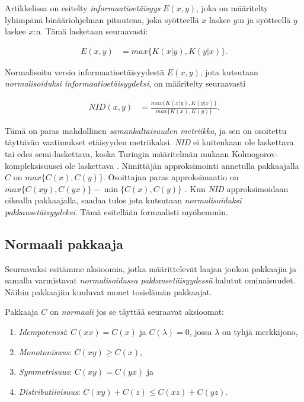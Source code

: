 \documentclass[12pt,finnish]{tktltiki2}
\theoremstyle{definition}
\theoremstyle{remark}
\newcommand{\kolmogorov}{Kolmogorov-kompleksisuus}
\begin{document}
  Artikkelissa \cite{CV05} on esitelty \emph{informaatioetäisyys} $E(x,y)$, joka on määritelty lyhimpänä binääriohjelman pituutena, joka syötteellä $x$ laskee $y$:n ja syötteellä $y$ laskee $x$:n. Tämä lasketaan seuraavasti:

  \begin{align}
    E(x,y) &= max\{K(x|y),K(y|x)\}.
  \end{align}

  Normalisoitu versio informaatioetäisyydestä $E(x,y)$, jota kutsutaan \emph{normalisoiduksi informaatioetäisyydeksi}, on määritelty seuraavasti

  \begin{align}
    NID(x,y) &= \frac{ max\{K{(x|y)},K{(y|x)}\} }{ max \{K(x),K(y)\}}.
  \end{align}

  Tämä on paras mahdollinen \emph{samankaltaisuuden metriikka}, ja sen on osoitettu \cite{CV05} täyttävän vaatimukset etäisyyden metriikaksi.
  \emph{NID} ei kuitenkaan ole laskettava tai edes semi-laskettava, koska Turingin määritelmän mukaan \kolmogorov ei ole laskettava \cite{CV05}.
  Nimittäjän approksimointi annetulla pakkaajalla $C$ on $max \{C(x),C(y)\}$.
  Osoittajan paras approksimaatio on $max\{C(xy),C(yx)\} - \min\{C(x),C(y)\}$ \cite{CV05}.
  Kun \emph{NID} approksimoidaan oikealla pakkaajalla, saadaa tulos jota kutsutaan \emph{normalisoiduksi pakkausetäisyydeksi}.
  Tämä esitellään formaalisti myöhemmin.

\subsection{Normaali pakkaaja} %
\label{sub:normaali_pakkaaja}

  Seuraavaksi esitämme aksioomia, jotka määrittelevät laajan joukon pakkaajia ja samalla varmistavat \emph{normalisoidussa pakkausetäisyydessä} halutut ominaisuudet.
  Näihin pakkaajiin kuuluvat monet tosielämän pakkaajat.

  Pakkaaja $C$ on \emph{normaali} jos se täyttää seuraavat aksioomat:

  \label{idempotency}
  \begin{enumerate}
    \item \emph{Idempotenssi}: $C(xx) = C(x)$ ja $C(\lambda) = 0$, jossa $\lambda$ on tyhjä merkkijono,
    \item \emph{Monotonisuus}: $C(xy) \geq C(x)$,
    \item \emph{Symmetrisuus}: $C(xy) = C(yx)$ ja
    \item \emph{Distributiivisuus}: $C(xy) + C(z) \leq C(xz) + C(yz)$.
  \end{enumerate}
\end{document}
